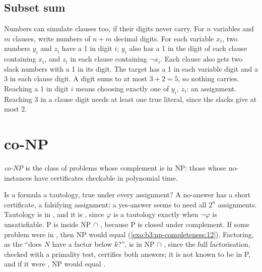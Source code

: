 \subsection{Subset sum}

Numbers can simulate clauses too, if their digits never carry. For $n$ variables and $m$ clauses, write numbers of $n + m$ decimal digits. For each variable $x_i$, two numbers $y_i$ and $z_i$ have a 1 in digit $i$; $y_i$ also has a 1 in the digit of each clause containing $x_i$, and $z_i$ in each clause containing $\neg x_i$. Each clause also gets two slack numbers with a 1 in its digit. The target has a 1 in each variable digit and a 3 in each clause digit. A digit sums to at most $3 + 2 = 5$, so nothing carries. Reaching a 1 in digit $i$ means choosing exactly one of $y_i$, $z_i$: an assignment. Reaching 3 in a clause digit needs at least one true literal, since the slacks give at most 2.

\label{lst:b3:np-completeness:ss}

\label{out:b3:np-completeness:ss}

\section{co-NP}\label{sec:b3:np-completeness:conp}

\begin{definition}[co-NP]\label{def:b3:np-completeness:conp}
\emph{co-NP} is the class of problems whose complement is in NP: those whose no-instances have certificates checkable in polynomial time.
\end{definition}

Is a formula a tautology, true under every assignment? A no-answer has a short certificate, a falsifying assignment; a yes-answer seems to need all $2^n$ assignments. Tautology is in , and it is , since $\varphi$ is a tautology exactly when $\neg \varphi$ is unsatisfiable. P is inside NP $\cap$ , because P is closed under complement. If some  problem were in , then NP would equal  (\cref{exo:b3:np-completeness:12}). Factoring, as the  ``does $N$ have a factor below $k$?'', is in NP $\cap$ , since the full factorisation, checked with a primality test, certifies both answers; it is not known to be in P, and if it were , NP would equal .

